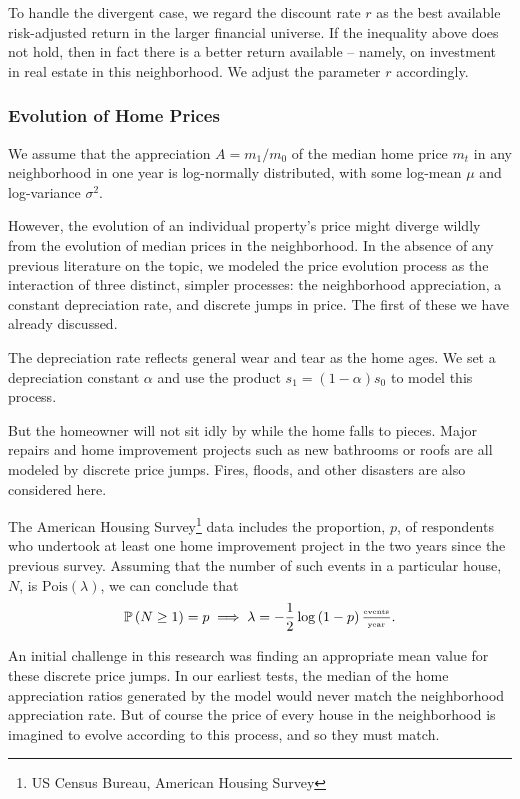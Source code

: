 \documentclass[twoside]{article}
\renewcommand{\P}{\mathbb{P}}
\begin{document}
To handle the divergent case, we regard the discount rate $r$ as the best available risk-adjusted return in the larger financial universe. If the inequality above does not hold, then in fact there is a better return available -- namely, on investment in real estate in this neighborhood. We adjust the parameter $r$ accordingly.

\subsubsection{Evolution of Home Prices}
We assume that the appreciation $A=m_1/m_0$ of the median home price $m_t$ in any neighborhood in one year is log-normally distributed, with some log-mean $\mu$ and log-variance $\sigma^2$.

However, the evolution of an individual property's price might diverge wildly from the evolution of median prices in the neighborhood. In the absence of any previous literature on the topic, we modeled the price evolution process as the interaction of three distinct, simpler processes: the neighborhood appreciation, a constant depreciation rate, and discrete jumps in price. The first of these we have already discussed.

The depreciation rate reflects general wear and tear as the home ages. We set a depreciation constant $\alpha$ and use the product $s_1=(1-\alpha)s_0$ to model this process.

But the homeowner will not sit idly by while the home falls to pieces. Major repairs and home improvement projects such as new bathrooms or roofs are all modeled by discrete price jumps. Fires, floods, and other disasters are also considered here.

The American Housing Survey\footnote{US Census Bureau, American Housing Survey} data includes the proportion, $p$, of respondents who undertook at least one home improvement project in the two years since the previous survey. Assuming that the number of such events in a particular house, $N$, is $\mathrm{Pois}(\lambda)$, we can conclude that
$$
\P\left(N\geq1\right)=p\implies \lambda = -\frac{1}{2}\log\left(1-p\right)\frac{_\text{\tiny{events}}}{^\text{\tiny{year}}}.
$$

An initial challenge in this research was finding an appropriate mean value for these discrete price jumps. In our earliest tests, the median of the home appreciation ratios generated by the model would never match the neighborhood appreciation rate. But of course the price of every house in the neighborhood is imagined to evolve according to this process, and so they must match.
\end{document}
